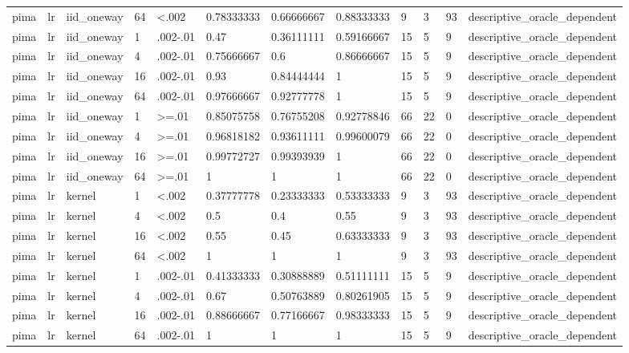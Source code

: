 \begin{tabular}{llllllllllll}
pima & lr & iid\_oneway & 64 & <.002 & 0.78333333 & 0.66666667 & 0.88333333 & 9 & 3 & 93 & descriptive\_oracle\_dependent \\
pima & lr & iid\_oneway & 1 & .002-.01 & 0.47 & 0.36111111 & 0.59166667 & 15 & 5 & 9 & descriptive\_oracle\_dependent \\
pima & lr & iid\_oneway & 4 & .002-.01 & 0.75666667 & 0.6 & 0.86666667 & 15 & 5 & 9 & descriptive\_oracle\_dependent \\
pima & lr & iid\_oneway & 16 & .002-.01 & 0.93 & 0.84444444 & 1 & 15 & 5 & 9 & descriptive\_oracle\_dependent \\
pima & lr & iid\_oneway & 64 & .002-.01 & 0.97666667 & 0.92777778 & 1 & 15 & 5 & 9 & descriptive\_oracle\_dependent \\
pima & lr & iid\_oneway & 1 & >=.01 & 0.85075758 & 0.76755208 & 0.92778846 & 66 & 22 & 0 & descriptive\_oracle\_dependent \\
pima & lr & iid\_oneway & 4 & >=.01 & 0.96818182 & 0.93611111 & 0.99600079 & 66 & 22 & 0 & descriptive\_oracle\_dependent \\
pima & lr & iid\_oneway & 16 & >=.01 & 0.99772727 & 0.99393939 & 1 & 66 & 22 & 0 & descriptive\_oracle\_dependent \\
pima & lr & iid\_oneway & 64 & >=.01 & 1 & 1 & 1 & 66 & 22 & 0 & descriptive\_oracle\_dependent \\
pima & lr & kernel & 1 & <.002 & 0.37777778 & 0.23333333 & 0.53333333 & 9 & 3 & 93 & descriptive\_oracle\_dependent \\
pima & lr & kernel & 4 & <.002 & 0.5 & 0.4 & 0.55 & 9 & 3 & 93 & descriptive\_oracle\_dependent \\
pima & lr & kernel & 16 & <.002 & 0.55 & 0.45 & 0.63333333 & 9 & 3 & 93 & descriptive\_oracle\_dependent \\
pima & lr & kernel & 64 & <.002 & 1 & 1 & 1 & 9 & 3 & 93 & descriptive\_oracle\_dependent \\
pima & lr & kernel & 1 & .002-.01 & 0.41333333 & 0.30888889 & 0.51111111 & 15 & 5 & 9 & descriptive\_oracle\_dependent \\
pima & lr & kernel & 4 & .002-.01 & 0.67 & 0.50763889 & 0.80261905 & 15 & 5 & 9 & descriptive\_oracle\_dependent \\
pima & lr & kernel & 16 & .002-.01 & 0.88666667 & 0.77166667 & 0.98333333 & 15 & 5 & 9 & descriptive\_oracle\_dependent \\
pima & lr & kernel & 64 & .002-.01 & 1 & 1 & 1 & 15 & 5 & 9 & descriptive\_oracle\_dependent \\

\end{tabular}
